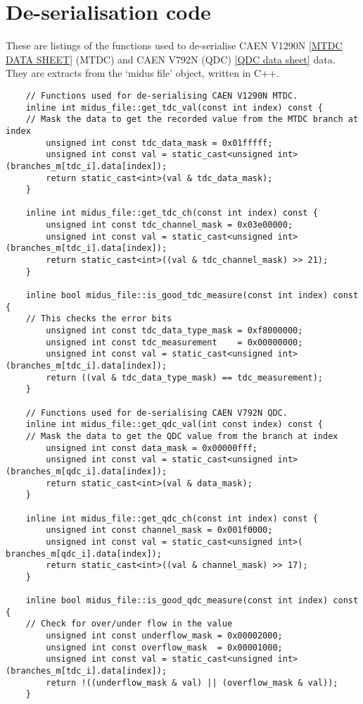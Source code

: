\documentclass[]{article}
\begin{document}
\section{De-serialisation code} %
\label{app:deserialisation}
These are listings of the functions used to de-serialise CAEN V1290N \ref{MTDC DATA SHEET} (MTDC) and CAEN V792N (QDC) \ref{QDC data sheet} data. They are extracts from the `midus file' object, written in C++.
	\begin{verbatim}
    // Functions used for de-serialising CAEN V1290N MTDC.
    inline int midus_file::get_tdc_val(const int index) const {
    // Mask the data to get the recorded value from the MTDC branch at index
        unsigned int const tdc_data_mask = 0x01fffff;
        unsigned int const val = static_cast<unsigned int>(branches_m[tdc_i].data[index]);
        return static_cast<int>(val & tdc_data_mask);
    }
    
    inline int midus_file::get_tdc_ch(const int index) const {
        unsigned int const tdc_channel_mask = 0x03e00000;
        unsigned int const val = static_cast<unsigned int>(branches_m[tdc_i].data[index]);
        return static_cast<int>((val & tdc_channel_mask) >> 21);
    }
    
    inline bool midus_file::is_good_tdc_measure(const int index) const {
    // This checks the error bits
        unsigned int const tdc_data_type_mask = 0xf8000000;
        unsigned int const tdc_measurement    = 0x00000000;
        unsigned int const val = static_cast<unsigned int>(branches_m[tdc_i].data[index]);
        return ((val & tdc_data_type_mask) == tdc_measurement);
    }
    
    // Functions used for de-serialising CAEN V792N QDC.
    inline int midus_file::get_qdc_val(int const index) const {
    // Mask the data to get the QDC value from the branch at index
    	unsigned int const data_mask = 0x00000fff;
    	unsigned int const val = static_cast<unsigned int>(branches_m[qdc_i].data[index]);
    	return static_cast<int>(val & data_mask); 
    }
    
    inline int midus_file::get_qdc_ch(const int index) const {
        unsigned int const channel_mask = 0x001f0000;
        unsigned int const val = static_cast<unsigned int>( branches_m[qdc_i].data[index]);
        return static_cast<int>((val & channel_mask) >> 17);
    }
    
    inline bool midus_file::is_good_qdc_measure(const int index) const {
    // Check for over/under flow in the value
        unsigned int const underflow_mask = 0x00002000;
        unsigned int const overflow_mask  = 0x00001000;
        unsigned int const val = static_cast<unsigned int>(branches_m[tdc_i].data[index]);
        return !((underflow_mask & val) || (overflow_mask & val));
    }
    \end{verbatim}



\end{document}
